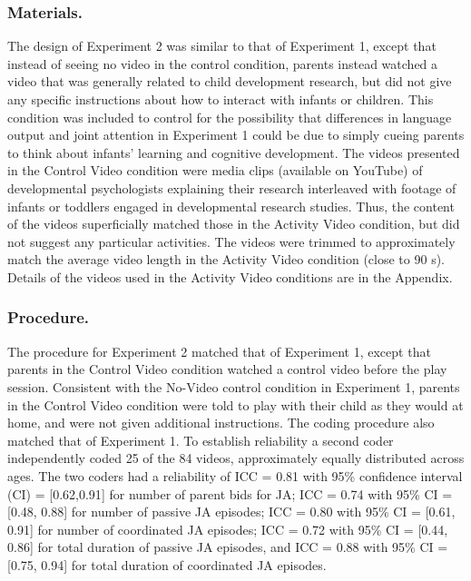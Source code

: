 \documentclass[man,floatsintext]{apa6}
\begin{document}
\hypertarget{materials.-1}{%
\subsubsection{Materials.}\label{materials.-1}}

The design of Experiment 2 was similar to that of Experiment 1, except that instead of seeing no video in the control condition, parents instead watched a video that was generally related to child development research, but did not give any specific instructions about how to interact with infants or children.
This condition was included to control for the possibility that differences in language output and joint attention in Experiment 1 could be due to simply cueing parents to think about infants' learning and cognitive development.
The videos presented in the Control Video condition were media clips (available on YouTube) of developmental psychologists explaining their research interleaved with footage of infants or toddlers engaged in developmental research studies.
Thus, the content of the videos superficially matched those in the Activity Video condition, but did not suggest any particular activities.
The videos were trimmed to approximately match the average video length in the Activity Video condition (close to 90 s).
Details of the videos used in the Activity Video conditions are in the Appendix.

\hypertarget{procedure.-1}{%
\subsubsection{Procedure.}\label{procedure.-1}}

The procedure for Experiment 2 matched that of Experiment 1, except that parents in the Control Video condition watched a control video before the play session.
Consistent with the No-Video control condition in Experiment 1, parents in the Control Video condition were told to play with their child as they would at home, and were not given additional instructions.
The coding procedure also matched that of Experiment 1.
To establish reliability a second coder independently coded 25 of the 84 videos, approximately equally distributed across ages.
The two coders had a reliability of ICC = 0.81 with 95\% confidence interval (CI) = {[}0.62,0.91{]} for number of parent bids for JA; ICC = 0.74 with 95\% CI = {[}0.48, 0.88{]} for number of passive JA episodes; ICC = 0.80 with 95\% CI = {[}0.61, 0.91{]} for number of coordinated JA episodes; ICC = 0.72 with 95\% CI = {[}0.44, 0.86{]} for total duration of passive JA episodes, and ICC = 0.88 with 95\% CI = {[}0.75, 0.94{]} for total duration of coordinated JA episodes.
\end{document}
